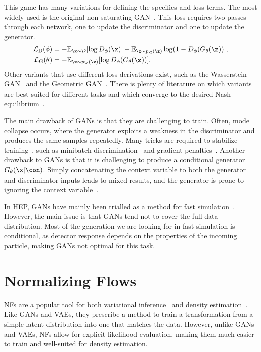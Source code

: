 This game has many variations for defining the specifics and loss terms.
The most widely used is the original non-saturating GAN~\cite{GenerativeAdversarialNetworks}.
This loss requires two passes through each network, one to update the discriminator and one to update the generator.
\begin{align}
    \mathcal{L}_{\text{D}}(\phi)   & = -\mathbb{E}_{\x \sim \mathcal{D}}[\log D_{\phi}(\x)] - \mathbb{E}_{\z \sim p_\Z(\z)}\log(1 - D_{\phi}(G_{\theta}(\z))], \\
    \mathcal{L}_{\text{G}}(\theta) & = -\mathbb{E}_{\z \sim p_\Z(\z)}[\log D_{\phi}(G_{\theta}(\z))].
\end{align}
Other variants that use different loss derivations exist, such as the Wasserstein GAN~\cite{WGAN1} and the Geometric GAN~\cite{GeometricGAN}.
There is plenty of literature on which variants are best suited for different tasks and which converge to the desired Nash equilibrium~\cite{WhichTrainingMethods}.

The main drawback of GANs is that they are challenging to train.
Often, mode collapse occurs, where the generator exploits a weakness in the discriminator and produces the same samples repeatedly.
Many tricks are required to stabilize training~\cite{WhichTrainingMethods}, such as minibatch discrimination~\cite{ProGAN} and gradient penalties~\cite{WGAN}.
Another drawback to GANs is that it is challenging to produce a conditional generator $G_\theta(\x|\con)$.
Simply concatenating the context variable to both the generator and discriminator inputs leads to mixed results, and the generator is prone to ignoring the context variable~\cite{cGAN}.

In HEP, GANs have mainly been trialled as a method for fast simulation~\cite{MPGAN, GAPT, CaloGAN, EPICGAN}.
However, the main issue is that GANs tend not to cover the full data distribution.
Most of the generation we are looking for in fast simulation is conditional, as detector response depends on the properties of the incoming particle, making GANs not optimal for this task.

\section{Normalizing Flows}
\label{sec:flows}

NFs are a popular tool for both variational inference~\cite{VariationalInferenceNormalizing, NormalizingFlowsProbabilistic}
and density estimation~\cite{NICENonlinearIndependent}.
Like GANs and VAEs, they prescribe a method to train a transformation from a simple latent distribution into one that matches the data.
However, unlike GANs and VAEs, NFs allow for explicit likelihood evaluation, making them much easier to train and well-suited for density estimation.

